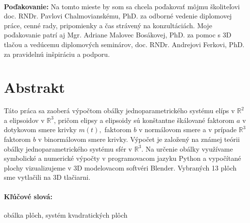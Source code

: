\documentclass[12pt, twoside]{book}
\theoremstyle{definition}
\begin{document}

\frontmatter

\setcounter{page}{3}
\newpage 
~

\vfill
{\bf Poďakovanie:} Na tomto mieste by som sa chcela poďakovať môjmu školiteľovi
doc. RNDr. Pavlovi Chalmovianskému, PhD. za odborné vedenie diplomovej práce, cenné rady, pripomienky a čas strávený na konzultáciách. Moje poďakovanie patrí aj Mgr. Adriane Malovec Bosákovej, PhD. za pomoc s 3D tlačou a vedúcemu diplomových seminárov, doc. RNDr. Andrejovi Ferkovi, PhD. za pravidelnú inšpiráciu a podporu.


\newpage 
\section*{Abstrakt}
\noindent Táto práca sa zaoberá výpočtom obálky jednoparametrického systému elíps v $\mathbb{R}^2$ a elipsoidov v $\mathbb{R}^3$, pričom elipsy a elipsoidy sú konštantne škálované faktorom $a$ v dotykovom smere krivky $m(t),$ faktorom $b$ v normálovom smere a v prípade $\mathbb{R}^3$ faktorom $b$ v binormálovom smere krivky. Výpočet je založený na známej teórii obálky jednoparametrického systému sfér v $\mathbb{R}^3.$ Na určenie obálky využívame symbolické a numerické výpočty v programovacom jazyku Python a vypočítané plochy vizualizujeme v 3D modelovacom softvéri Blender. Vybraných 13 plôch sme vytlačili na 3D tlačiarni.

\paragraph*{Kľúčové slová:} obálka plôch, systém kvadratických plôch
\end{document}
